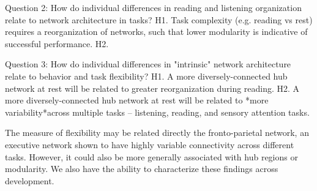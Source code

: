 Question 2: How do individual differences in reading and listening organization relate to network architecture in tasks?
H1. Task complexity (e.g. reading vs rest) requires a reorganization of networks, such that lower modularity is indicative of successful performance.
H2. 

Question 3: How do individual differences in "intrinsic" network architecture relate to behavior and task flexibility?
H1.	A more diversely-connected hub network at rest will be related to greater reorganization during reading.
H2.	A more diversely-connected hub network at rest will be related to *more variability*across multiple tasks – listening, reading, and sensory attention tasks.

The measure of flexibility may be related directly the fronto-parietal network, an executive network shown to have highly variable connectivity across different tasks. However, it could also be more generally associated with hub regions or modularity. We also have the ability to characterize these findings across development.